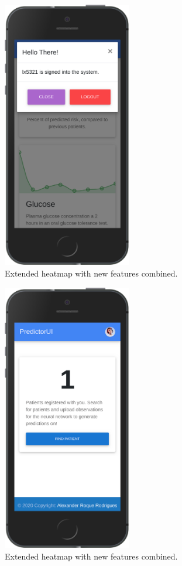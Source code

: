\documentclass[12pt]{article}
\begin{document}
\begin{figure}[ht]
\centering
\includegraphics[width=0.5\textwidth]{5se.png}
\caption{\label{fig:54} Extended heatmap with new features combined.}
\end{figure}
\begin{figure}[ht]
\centering
\includegraphics[width=0.5\textwidth]{6se.png}
\caption{\label{fig:55} Extended heatmap with new features combined.}
\end{figure}
\end{document}
